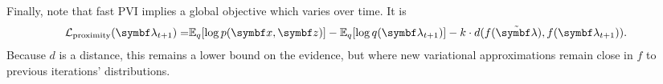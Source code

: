 Finally, note that fast \gls{PVI} implies a global objective which varies over time.  It is
\begin{align*}
  \cL_{\textrm{proximity}}(\mblambda_{t+1}) = &\E_q [ \log p(\mbx, \mbz)] - \E_q [ \log q(\mblambda_{t+ 1})] %
  - k \cdot d(f(\tmblambda), f(\mblambda_{t+1})).
\end{align*}
Because $d$ is a distance, this remains a lower bound on the evidence, but where new variational approximations remain close in $f$ to previous iterations' distributions.